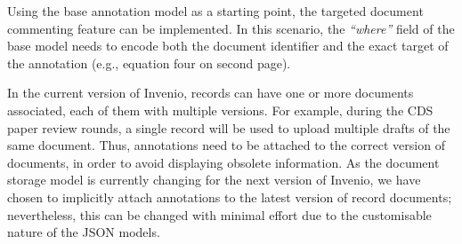 
Using the base annotation model as a starting point, the targeted document
commenting feature can be implemented. In this scenario, the \textit{``where''}
field of the base model needs to encode both the document identifier and the
exact target of the annotation (e.g., equation four on second page).

In the current version of Invenio, records can have one or more documents
associated, each of them with multiple versions. For example, during the CDS
paper review rounds, a single record will be used to upload multiple drafts of
the same document. Thus, annotations need to be attached to the correct version
of documents, in order to avoid displaying obsolete information. As the document
storage model is currently changing for the next version of Invenio, we have
chosen to implicitly attach annotations to the latest version of record
documents; nevertheless, this can be changed with minimal effort due to the
customisable nature of the JSON models.

\newpage

